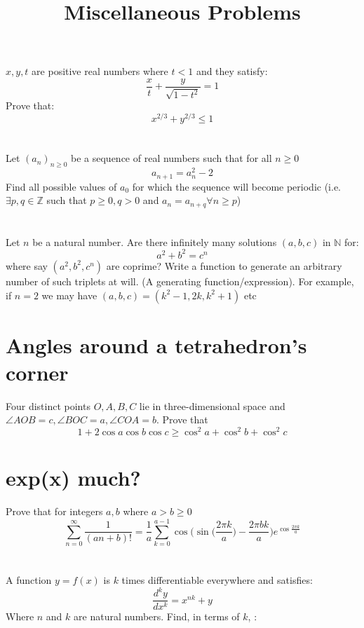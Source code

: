 \documentclass{article}
\author{\vspace{-10ex}}
\title{Miscellaneous Problems}
\date{\vspace{-10ex}}
\begin{document}
\maketitle

\section{}
$x,y,t$ are positive real numbers where $t<1$ and they satisfy:
$$\frac{x}{t} + \frac{y}{\sqrt{1-t^2}} = 1$$
Prove that:
$$x^{2/3} + y^{2/3} \leq 1$$

\section{}
Let $(a_n)_{n\geq0}$ be a sequence of real numbers such that for all $n\geq0$
$$a_{n+1} = a_n^2 - 2$$
Find all possible values of $a_0$ for which the sequence will become periodic (i.e. $\exists p,q \in \mathbb{Z}$ such that $p\geq 0, q>0$ and $a_n = a_{n+q} \forall n\geq p$)

\section{}
Let $n$ be a natural number. Are there infinitely many solutions $(a,b,c)$ in $\mathbb{N}$ for:
$$a^2 + b^2 = c^n$$ where say $(a^2 ,b^2, c^n)$ are coprime? Write a function to generate an arbitrary number of such triplets at will. (A generating function/expression). For example, if $n=2$ we may have $(a,b,c) = (k^2-1, 2k, k^2+1)$ etc

\section{Angles around a tetrahedron's corner}
Four distinct points $O,A,B,C$ lie in three-dimensional space and $\angle AOB = c, \angle BOC = a, \angle COA = b$. Prove that
$$1+2\cos a\cos b\cos c \geq \cos^2 a + \cos^2b + \cos^2c$$

\section{exp(x) much?}
Prove that for integers $a,b$ where $a>b \geq 0$
$$\sum_{n=0}^{\infty} \frac {1}{(an+b)!} = \frac {1}{a} \sum_{k=0}^{a-1} \cos \bigg(\sin \bigg( \frac {2 \pi k}{a} \bigg) - \frac {2 \pi b k}{a} \bigg) e ^{\cos \frac {2 \pi k}{a}  }  $$

\section{}
A function $y= f(x)$
is $k$ times differentiable everywhere and satisfies:
$$ \frac {d^k y}{dx^k}= x^{nk} + y$$
Where $n$ and $k$ are natural numbers. Find, in terms of $k$, :
\end{document}
